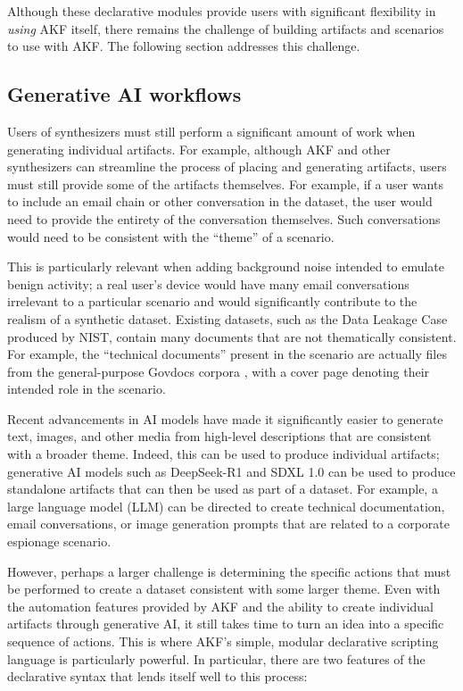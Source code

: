 Although these declarative modules provide users with significant
flexibility in \emph{using} AKF itself, there remains the challenge of
building artifacts and scenarios to use with AKF. The following section
addresses this challenge.

\subsection{Generative AI workflows}\label{generative-ai-workflows}

Users of synthesizers must still perform a significant amount of work
when generating individual artifacts. For example, although AKF and
other synthesizers can streamline the process of placing and generating
artifacts, users must still provide some of the artifacts themselves.
For example, if a user wants to include an email chain or other
conversation in the dataset, the user would need to provide the entirety
of the conversation themselves. Such conversations would need to be
consistent with the ``theme'' of a scenario.

This is particularly relevant when adding background noise intended to
emulate benign activity; a real user's device would have many email
conversations irrelevant to a particular scenario and would
significantly contribute to the realism of a synthetic dataset. Existing
datasets, such as the Data Leakage Case produced by NIST, contain many
documents that are not thematically consistent. For example, the
``technical documents'' present in the scenario are actually files from
the general-purpose Govdocs corpora
\citep{garfinkelBringingScienceDigital2009}, with a cover page
denoting their intended role in the scenario.

Recent advancements in AI models have made it significantly easier to
generate text, images, and other media from high-level descriptions that
are consistent with a broader theme. Indeed, this can be used to produce
individual artifacts; generative AI models such as DeepSeek-R1
\citep{deepseek-aiDeepSeekR1IncentivizingReasoning2025} and SDXL 1.0
\citep{podellSDXLImprovingLatent2023} can be used to produce
standalone artifacts that can then be used as part of a dataset. For
example, a large language model (LLM) can be directed to create
technical documentation, email conversations, or image generation
prompts that are related to a corporate espionage scenario.

However, perhaps a larger challenge is determining the specific actions
that must be performed to create a dataset consistent with some larger
theme. Even with the automation features provided by AKF and the ability
to create individual artifacts through generative AI, it still takes
time to turn an idea into a specific sequence of actions. This is where
AKF's simple, modular declarative scripting language is particularly
powerful. In particular, there are two features of the declarative
syntax that lends itself well to this process:

